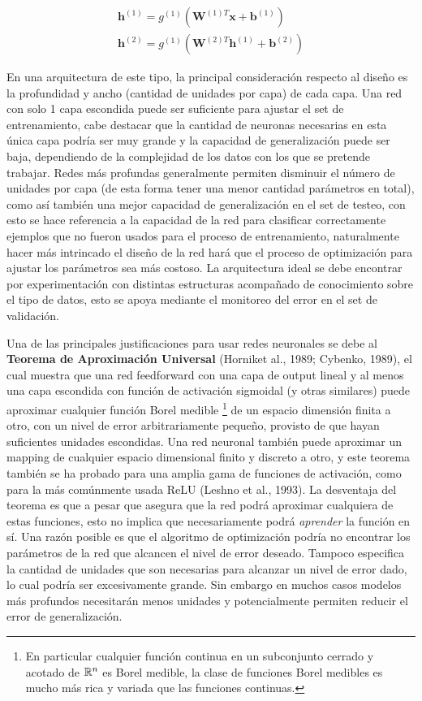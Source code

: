 \begin{equation}
\begin{split}
\bm{h}^{(1)} = g^{(1)}(\bm{W}^{(1) T}\bm{x} + \bm{b}^{(1)}) \\
\bm{h}^{(2)} = g^{(1)}(\bm{W}^{(2) T}\bm{h}^{(1)} + \bm{b}^{(2)})
\end{split}
\end{equation}

En una arquitectura de este tipo, la principal consideraci\'on respecto al dise\~{n}o es la profundidad y ancho (cantidad de unidades por capa) de cada capa. Una red con solo 1 capa escondida puede ser suficiente para ajustar el set de entrenamiento, cabe destacar que la cantidad de neuronas necesarias en esta única capa podría ser muy grande y la capacidad de generalización puede ser baja, dependiendo de la complejidad de los datos con los que se pretende trabajar. Redes m\'as profundas generalmente permiten disminuir el n\'umero de unidades por capa (de esta forma tener una menor cantidad par\'ametros en total), como as\'i tambi\'en una mejor capacidad de generalización en el set de testeo, con esto se hace referencia a la capacidad de la red para clasificar correctamente ejemplos que no fueron usados para el proceso de entrenamiento, naturalmente hacer más intrincado el diseño de la red hará que el proceso de optimización para ajustar los parámetros sea más costoso. La arquitectura ideal se debe encontrar por experimentaci\'on con distintas estructuras acompañado de conocimiento sobre el tipo de datos, esto se apoya mediante el monitoreo del error en el set de validaci\'on.

Una de las principales justificaciones para usar redes neuronales se debe al \textbf{Teorema de Aproximaci\'on Universal} (Horniket al., 1989; Cybenko, 1989), el cual muestra que una red feedforward con una capa de output lineal y al menos una capa escondida con funci\'on de activaci\'on sigmoidal (y otras similares) puede aproximar cualquier funci\'on Borel medible \footnote{En particular cualquier funci\'on continua en un subconjunto cerrado y acotado de $\mathbb{R}^{n}$ es Borel medible, la clase de funciones Borel medibles es mucho más rica y variada que las funciones continuas.} de un espacio dimensión finita a otro, con un nivel de error arbitrariamente pequeño, provisto de que hayan suficientes unidades escondidas. Una red neuronal tambi\'en puede aproximar un mapping de cualquier espacio dimensional finito y discreto a otro, y este teorema tambi\'en se ha probado para una amplia gama de funciones de activaci\'on, como para la m\'as com\'unmente usada ReLU (Leshno et al., 1993). La desventaja del teorema es que a pesar que asegura que la red podr\'a aproximar cualquiera de estas funciones, esto no implica que necesariamente podr\'a \textit{aprender} la funci\'on en sí. Una razón posible es que el algoritmo de optimizaci\'on podr\'ia no encontrar los par\'ametros de la red que alcancen el nivel de error deseado. Tampoco especifica la cantidad de unidades que son necesarias para alcanzar un nivel de error dado, lo cual podr\'ia ser excesivamente grande. Sin embargo en muchos casos modelos m\'as profundos necesitar\'an menos unidades y potencialmente permiten reducir el error de generalizaci\'on.

